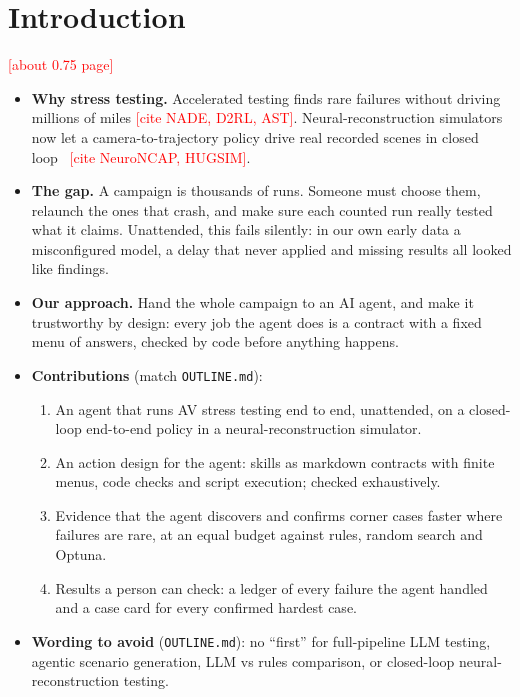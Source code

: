 \documentclass[conference]{IEEEtran}
\newcommand{\pending}[1]{\textcolor{red}{[#1]}}
\begin{document}
\section{Introduction}\label{sec:intro}
\pending{about 0.75 page}
\begin{itemize}
\item \textbf{Why stress testing.} Accelerated testing finds rare failures without driving millions of miles \pending{cite NADE, D2RL, AST}. Neural-reconstruction simulators now let a camera-to-trajectory policy drive real recorded scenes in closed loop~\cite{alpasim} \pending{cite NeuroNCAP, HUGSIM}.
\item \textbf{The gap.} A campaign is thousands of runs. Someone must choose them, relaunch the ones that crash, and make sure each counted run really tested what it claims. Unattended, this fails silently: in our own early data a misconfigured model, a delay that never applied and missing results all looked like findings.
\item \textbf{Our approach.} Hand the whole campaign to an AI agent, and make it trustworthy by design: every job the agent does is a contract with a fixed menu of answers, checked by code before anything happens.
\item \textbf{Contributions} (match \texttt{OUTLINE.md}):
  \begin{enumerate}
  \item An agent that runs AV stress testing end to end, unattended, on a closed-loop end-to-end policy in a neural-reconstruction simulator.
  \item An action design for the agent: skills as markdown contracts with finite menus, code checks and script execution; checked exhaustively.
  \item Evidence that the agent discovers and confirms corner cases faster where failures are rare, at an equal budget against rules, random search and Optuna.
  \item Results a person can check: a ledger of every failure the agent handled and a case card for every confirmed hardest case.
  \end{enumerate}
\item \textbf{Wording to avoid} (\texttt{OUTLINE.md}): no ``first'' for full-pipeline LLM testing, agentic scenario generation, LLM vs rules comparison, or closed-loop neural-reconstruction testing.
\end{itemize}

\end{document}
